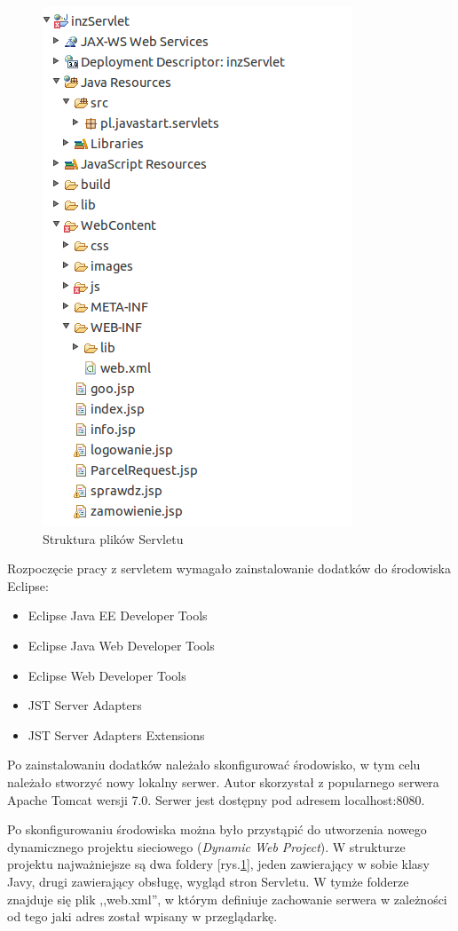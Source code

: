 \documentclass[eng,printmode,oneside]{mgr}
\begin{document}
\begin{figure}
\centering
\captionsetup{justification=centering,margin=0cm}
\vspace{-10pt}
\begin{center}
\includegraphics[width=.35\textwidth]{strukturaServlet.png}
\end{center}
\vspace{-10pt}
  \caption{Struktura plików Servletu}
\label{fig:servlet}
\vspace{-60pt}
\end{figure}

Rozpoczęcie pracy z servletem wymagało zainstalowanie dodatków do środowiska
Eclipse:
\begin{itemize}
  \item Eclipse Java EE Developer Tools
  \item Eclipse Java Web Developer Tools
  \item Eclipse Web Developer Tools
  \item JST Server Adapters
  \item JST Server Adapters Extensions
\end{itemize}

Po zainstalowaniu dodatków należało skonfigurować środowisko, w tym celu należało
stworzyć nowy lokalny serwer. Autor skorzystał z popularnego serwera Apache
Tomcat wersji 7.0. Serwer jest dostępny pod adresem localhost:8080. 

Po skonfigurowaniu środowiska można było przystąpić do utworzenia nowego
dynamicznego projektu sieciowego (\textsl{Dynamic Web Project}). W strukturze
projektu najważniejsze są dwa foldery [rys.\ref{fig:servlet}], jeden zawierający
w sobie klasy Javy, drugi zawierający obsługę, wygląd stron Servletu. W tymże
folderze znajduje się plik ,,web.xml'', w którym definiuje zachowanie serwera w
zależności od tego jaki adres został wpisany w przeglądarkę. 
\end{document}
